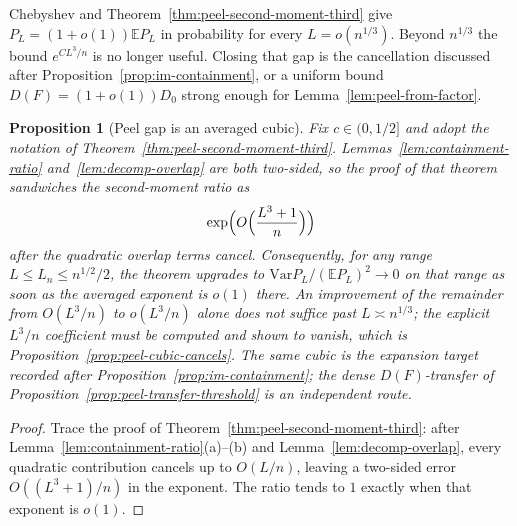 \documentclass[11pt]{article}
\newtheorem{proposition}[theorem]{Proposition}
\newcommand{\EE}{\mathbb{E}}
\newcommand{\Var}{\mathrm{Var}}
\begin{document}
Chebyshev and Theorem~\ref{thm:peel-second-moment-third} give
\(P_L=(1+o(1))\EE P_L\) in probability for every \(L=o(n^{1/3})\).
Beyond \(n^{1/3}\) the bound \(e^{CL^3/n}\) is no longer useful. Closing
that gap is the cancellation discussed after
Proposition~\ref{prop:im-containment}, or a uniform bound
\(D(F)=(1+o(1))D_0\) strong enough for Lemma~\ref{lem:peel-from-factor}.

\begin{proposition}[Peel gap is an averaged cubic]
\label{prop:peel-cubic-gap}
Fix \(c\in(0,1/2]\) and adopt the notation of
Theorem~\ref{thm:peel-second-moment-third}. Lemmas~\ref{lem:containment-ratio}
and~\ref{lem:decomp-overlap} are both two-sided, so the proof of that theorem
sandwiches the second-moment ratio as
\[
\exp\Bigl(O\Bigl(\frac{L^3+1}{n}\Bigr)\Bigr)
\]
after the quadratic overlap terms cancel. Consequently, for any range \(L\le L_n\le n^{1/2}/2\), the theorem upgrades
to \(\Var P_L/(\EE P_L)^2\to0\) on that range as soon as the averaged exponent
is \(o(1)\) there. An improvement of the remainder from \(O(L^3/n)\) to
\(o(L^3/n)\) alone does not suffice past \(L\asymp n^{1/3}\); the explicit
\(L^3/n\) coefficient must be computed and shown to vanish, which is
Proposition~\ref{prop:peel-cubic-cancels}.
The same cubic is the expansion target recorded after
Proposition~\ref{prop:im-containment}; the dense \(D(F)\)-transfer of
Proposition~\ref{prop:peel-transfer-threshold} is an independent route.
\end{proposition}

\begin{proof}
Trace the proof of Theorem~\ref{thm:peel-second-moment-third}: after
Lemma~\ref{lem:containment-ratio}(a)--(b) and Lemma~\ref{lem:decomp-overlap},
every quadratic contribution cancels up to \(O(L/n)\), leaving a two-sided
error \(O((L^3+1)/n)\) in the exponent. The ratio tends to \(1\) exactly when
that exponent is \(o(1)\).
\end{proof}
\end{document}
